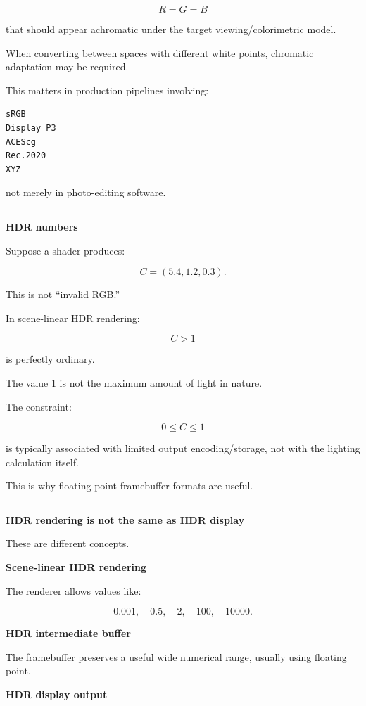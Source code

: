 \[
R=G=B
\]

that should appear achromatic under the target viewing/colorimetric model.

When converting between spaces with different white points, chromatic adaptation may be required.

This matters in production pipelines involving:

\begin{verbatim}
sRGB
Display P3
ACEScg
Rec.2020
XYZ
\end{verbatim}

not merely in photo-editing software.

\begin{center}\rule{0.5\linewidth}{0.5pt}\end{center}

\textbf{HDR numbers}

Suppose a shader produces:

\[
C=(5.4,1.2,0.3).
\]

This is not ``invalid RGB.''

In scene-linear HDR rendering:

\[
C>1
\]

is perfectly ordinary.

The value 1 is not the maximum amount of light in nature.

The constraint:

\[
0\le C\le1
\]

is typically associated with limited output encoding/storage, not with the lighting calculation itself.

This is why floating-point framebuffer formats are useful.

\begin{center}\rule{0.5\linewidth}{0.5pt}\end{center}

\textbf{HDR rendering is not the same as HDR display}

These are different concepts.

\textbf{Scene-linear HDR rendering}

The renderer allows values like:

\[
0.001,\quad0.5,\quad2,\quad100,\quad10000.
\]

\textbf{HDR intermediate buffer}

The framebuffer preserves a useful wide numerical range, usually using floating point.

\textbf{HDR display output}


